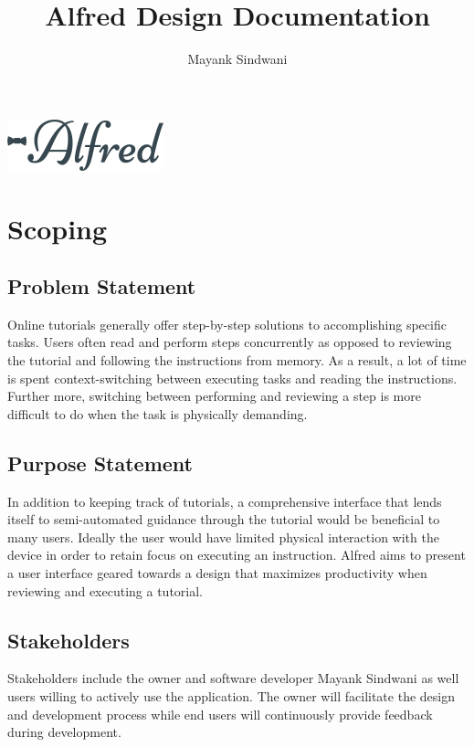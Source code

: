 \documentclass[12pt]{article}
\title{Alfred Design Documentation}
\author{Mayank Sindwani}
\begin{document}
\begin{titlepage}
    \centering
    \maketitle
    \includegraphics[scale=0.2]{images/logo.png}
    \tableofcontents
\end{titlepage}

\section{Scoping}

\subsection{Problem Statement}

Online tutorials generally offer step-by-step solutions to accomplishing specific tasks. Users often read and perform steps concurrently as opposed to reviewing the tutorial and following the instructions from memory. As a result, a lot of time is spent context-switching between executing tasks and reading the instructions. Further more, switching between performing and reviewing a step is more difficult to do when the task is physically demanding.


\subsection{Purpose Statement}

In addition to keeping track of tutorials, a comprehensive interface that lends itself to semi-automated guidance through the tutorial would be beneficial to many users. Ideally the user would have limited physical interaction with the device in order to retain focus on executing an instruction. Alfred aims to present a user interface geared towards a design that maximizes productivity when reviewing and executing a tutorial.  

\subsection{Stakeholders}

Stakeholders include the owner and software developer Mayank Sindwani as well users willing to actively use the application. The owner will facilitate the design and development process while end users will continuously provide feedback during development.
\end{document}

